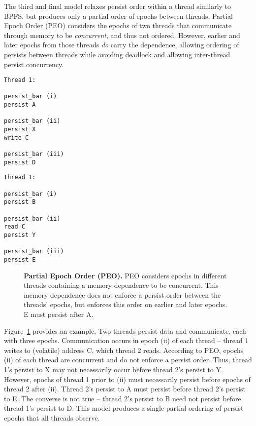 The third and final model relaxes persist order within a thread similarly to BPFS, but produces only a partial order of epochs between threads.
Partial Epoch Order (PEO) considers the epochs of two threads that communicate through memory to be \emph{concurrent}, and thus not ordered.
However, earlier and later epochs from those threads \emph{do} carry the dependence, allowing ordering of persists between threads while avoiding deadlock and allowing inter-thread persist concurrency.

{
\singlespacing
\newsavebox{\PEOThreadOne}
\begin{lrbox}{\PEOThreadOne}
  \begin{lstlisting}
Thread 1:

persist_bar (i)
persist A

persist_bar (ii)
persist X
write C

persist_bar (iii)
persist D
  \end{lstlisting}
\end{lrbox}

\newsavebox{\PEOThreadTwo}
\begin{lrbox}{\PEOThreadTwo}
  \begin{lstlisting}
Thread 1:

persist_bar (i)
persist B

persist_bar (ii)
read C
persist Y

persist_bar (iii)
persist E
  \end{lstlisting}
\end{lrbox}

\begin{figure}[]
\centering
\subfigure{ \usebox{\PEOThreadOne} }
\hspace{1 in}
\subfigure{ \usebox{\PEOThreadTwo} }
\caption{\textbf{Partial Epoch Order (PEO).} PEO considers epochs in different threads containing a memory dependence to be concurrent.  This memory dependence does not enforce a persist order between the threads' epochs, but enforces this order on earlier and later epochs.  E must persist after A.}
\label{fig:PEO}
\end{figure}
}

Figure~\ref{fig:PEO} provides an example.
Two threads persist data and communicate, each with three epochs.
Communication occurs in epoch (ii) of each thread -- thread 1 writes to (volatile) address C, which thread 2 reads.
According to PEO, epochs (ii) of each thread are concurrent and do not enforce a persist order.
Thus, thread 1's persist to X may not necessarily occur before thread 2's persist to Y.
However, epochs of thread 1 prior to (ii) must necessarily persist before epochs of thread 2 after (ii).
Thread 2's persist to A must persist before thread 2's persist to E.
The converse is not true -- thread 2's persist to B need not persist before thread 1's persist to D.
This model produces a single partial ordering of persist epochs that all threads observe.

